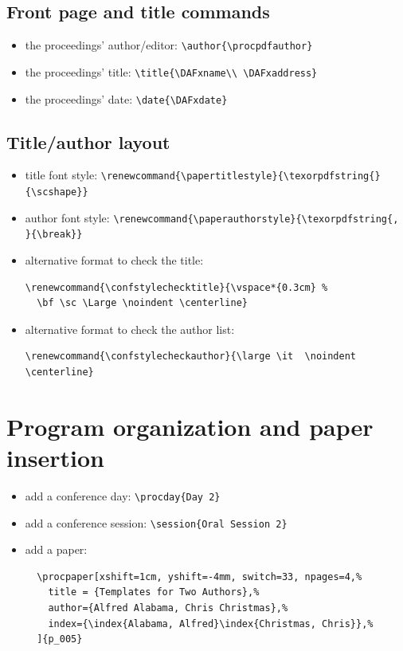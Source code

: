 \documentclass{article}
\begin{document}
\subsection{Front page and title commands}\label{sec:custom:front:page}

\begin{itemize}
  \item the proceedings' author/editor: \verb+\author{\procpdfauthor}+
  \item the proceedings' title: \verb+\title{\DAFxname\\ \DAFxaddress}+
  \item the proceedings' date: \verb+\date{\DAFxdate}+
\end{itemize}

\subsection{Title/author layout}

\begin{itemize}
  \item title font style: \verb+\renewcommand{\papertitlestyle}{\texorpdfstring{}{\scshape}}+
  \item author font style: \verb+\renewcommand{\paperauthorstyle}{\texorpdfstring{, }{\break}}+
  \item alternative format to check the title:
\begin{verbatim}
\renewcommand{\confstylechecktitle}{\vspace*{0.3cm} %
  \bf \sc \Large \noindent \centerline}
\end{verbatim}
  \item alternative format to check the author list: 
\begin{verbatim}
\renewcommand{\confstylecheckauthor}{\large \it  \noindent \centerline}
\end{verbatim}
\end{itemize}


\section{Program organization and paper insertion}

\begin{itemize}
  \item add a conference day: \verb+\procday{Day 2}+
  \item add a conference session: \verb+\session{Oral Session 2}+
  \item add a paper:
\begin{verbatim}
  \procpaper[xshift=1cm, yshift=-4mm, switch=33, npages=4,% 
    title = {Templates for Two Authors},%
    author={Alfred Alabama, Chris Christmas},%
    index={\index{Alabama, Alfred}\index{Christmas, Chris}},%
  ]{p_005}
\end{verbatim}
\end{itemize}
\end{document}
